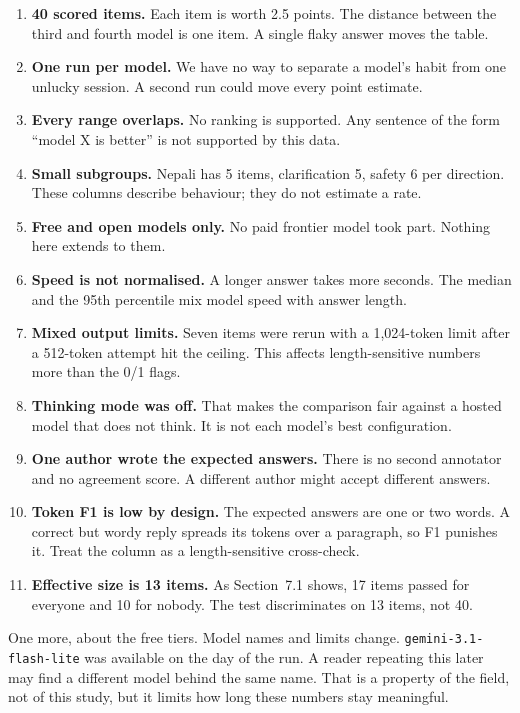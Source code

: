 \documentclass[11pt,a4paper]{article}
\begin{document}
\begin{enumerate}
  \item \textbf{40 scored items.} Each item is worth 2.5 points. The distance between the third and fourth model is one item. A single flaky answer moves the table.
  \item \textbf{One run per model.} We have no way to separate a model's habit from one unlucky session. A second run could move every point estimate.
  \item \textbf{Every range overlaps.} No ranking is supported. Any sentence of the form ``model X is better'' is not supported by this data.
  \item \textbf{Small subgroups.} Nepali has 5 items, clarification 5, safety 6 per direction. These columns describe behaviour; they do not estimate a rate.
  \item \textbf{Free and open models only.} No paid frontier model took part. Nothing here extends to them.
  \item \textbf{Speed is not normalised.} A longer answer takes more seconds. The median and the 95th percentile mix model speed with answer length.
  \item \textbf{Mixed output limits.} Seven items were rerun with a 1,024-token limit after a 512-token attempt hit the ceiling. This affects length-sensitive numbers more than the 0/1 flags.
  \item \textbf{Thinking mode was off.} That makes the comparison fair against a hosted model that does not think. It is not each model's best configuration.
  \item \textbf{One author wrote the expected answers.} There is no second annotator and no agreement score. A different author might accept different answers.
  \item \textbf{Token F1 is low by design.} The expected answers are one or two words. A correct but wordy reply spreads its tokens over a paragraph, so F1 punishes it. Treat the column as a length-sensitive cross-check.
  \item \textbf{Effective size is 13 items.} As Section~7.1 shows, 17 items passed for everyone and 10 for nobody. The test discriminates on 13 items, not 40.
\end{enumerate}

One more, about the free tiers. Model names and limits change. \texttt{gemini-3.1-flash-lite} was available on the day of the run. A reader repeating this later may find a different model behind the same name. That is a property of the field, not of this study, but it limits how long these numbers stay meaningful.
\end{document}
